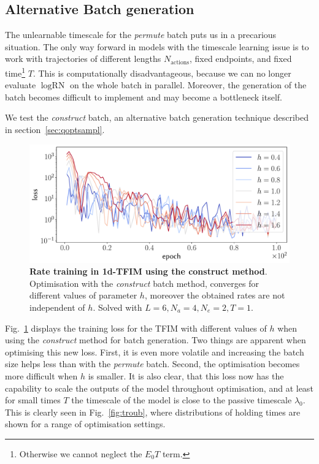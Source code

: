 \subsection{Alternative Batch generation}
The unlearnable timescale for the \emph{permute} batch puts us in a precarious situation. The only way forward in models with the timescale learning issue is to work with trajectories of different lengths $N_{\text{actions}}$, fixed endpoints, and fixed time\footnote{Otherwise we cannot neglect the $E_0T$ term.} $T$. This is computationally disadvantageous, because we can no longer evaluate $\log \text{RN}$ on the whole batch in parallel. Moreover, the generation of the batch becomes difficult to implement and may become a bottleneck itself. 

We test the \emph{construct} batch, an alternative batch generation technique described in section~\ref{sec:qoptsampl}. 
\begin{figure}[h]
	\centering
	\includegraphics[width=\linewidth]{Chapter5/Figs/Vector/constr-g-loss}
	\caption[Rate training in 1d-TFIM using the \emph{construct} method]{\textbf{Rate training in 1d-TFIM using the construct method}. Optimisation with the \emph{construct} batch method, converges for different values of parameter $h$, moreover the obtained rates are not independent of $h$. Solved with $L=6, N_a=4, N_e=2, T=1$.}
	\label{fig:constr-g-loss}
\end{figure}
Fig.~\ref{fig:constr-g-loss} displays the training loss for the TFIM with different values of $h$ when using the \emph{construct} method for batch generation. Two things are apparent when optimising this new loss. First, it is even more volatile and increasing the batch size helps less than with the \emph{permute} batch. Second, the optimisation becomes more difficult when $h$ is smaller. It is also clear, that this loss now has the capability to scale the outputs of the model throughout optimisation, and at least for small times $T$ the timescale of the model is close to the passive timescale $\lambda_0$. This is clearly seen in Fig.~\ref{fig:troub}, where distributions of holding times are shown for a range of optimisation settings. 
